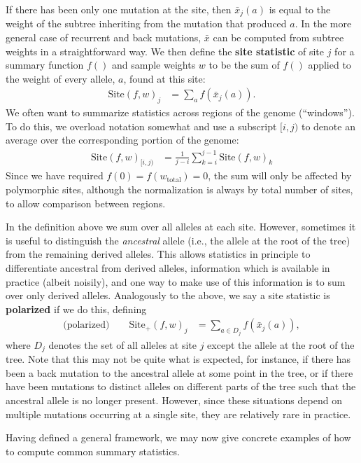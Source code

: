 \documentclass{article}
\newcommand{\site}{\mbox{Site}} %
\newcommand{\sitep}{\mbox{Site}_+} %
\newcommand{\iw}{w} %
\newcommand{\tiw}{w_\text{total}} %
\newcommand{\aw}{{\bar x}} %
\begin{document}
If there has been only one mutation at the site,
then $\aw_j(a)$ is equal to the weight of the subtree inheriting from the mutation that produced $a$.
In the more general case of recurrent and back mutations, $\aw$ can
be computed from subtree weights in a straightforward way.
We then define the \textbf{site statistic} of site $j$ for a summary function $f()$
and sample weights $\iw$ to be the sum of $f()$
applied to the weight of every allele, $a$, found at this site:
\begin{align}
    \site(f, \iw)_j
    &=
    \sum_{a} f(\aw_j(a)).
\end{align}
We often want to summarize statistics across regions of the genome (``windows'').
To do this, we overload notation somewhat and use a subscript $[i,j)$ to denote an average
over the corresponding portion of the genome:
\begin{align}
    \site(f, \iw)_{[i,j)}
    &=
    \frac{1}{j-i} \sum_{k=i}^{j-1} \site(f, \iw)_k
\end{align}
Since we have required $f(0) = f(\tiw) = 0$,
the sum will only be affected by polymorphic sites,
although the normalization is always by total number of sites, to allow comparison between regions.


In the definition above we sum over all alleles at each site.
However, sometimes it is useful to distinguish the \emph{ancestral} allele
(i.e., the allele at the root of the tree) from the remaining derived alleles.
This allows statistics in principle to differentiate ancestral from derived alleles,
information which is available in practice (albeit noisily),
and one way to make use of this information is to sum over only derived alleles.
Analogously to the above,
we say a site statistic is \textbf{polarized} if we do this,
defining
\begin{align} \label{eqn:site_polarised}
    \text{(polarized)} \qquad
    \sitep(f, \iw)_j
    &=
    \sum_{a \in D_j} f(\aw_j(a)) ,
\end{align}
where $D_j$ denotes the set of all alleles at site $j$ except the allele at the root of the tree.
Note that this may not be quite what is expected,
for instance, if there has been a back mutation to the ancestral allele at some point in the tree,
or if there have been mutations to distinct alleles on different parts of the tree
such that the ancestral allele is no longer present.
However, since these situations depend on multiple mutations occurring at a single site,
they are relatively rare in practice.

Having defined a general framework, we may now give concrete examples
of how to compute common summary statistics.
\end{document}
